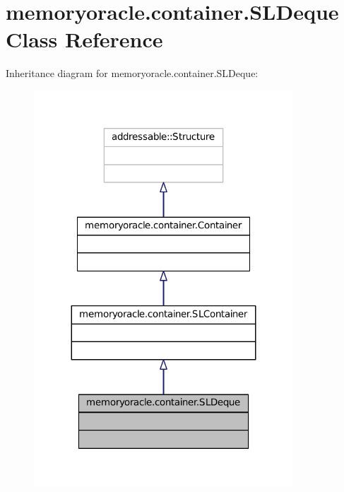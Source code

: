 \hypertarget{classmemoryoracle_1_1container_1_1SLDeque}{}\section{memoryoracle.\+container.\+S\+L\+Deque Class Reference}
\label{classmemoryoracle_1_1container_1_1SLDeque}


Inheritance diagram for memoryoracle.\+container.\+S\+L\+Deque\+:\nopagebreak
\begin{figure}[H]
\begin{center}
\leavevmode
\includegraphics[width=275pt]{classmemoryoracle_1_1container_1_1SLDeque__inherit__graph}
\end{center}
\end{figure}


